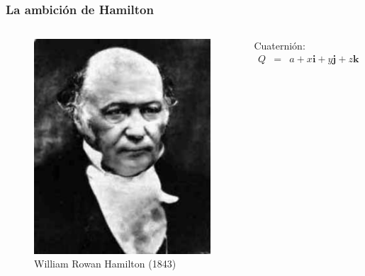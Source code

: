 \documentclass{beamer}
\begin{document}
\begin{frame}
    \frametitle{La ambición de Hamilton}
    \begin{columns}
        \begin{center}
            \begin{figure}
            \includegraphics[scale=0.4]{../gfx/hamilton}
                \caption{William Rowan Hamilton (1843)}
            \end{figure}
        \end{center}
        Cuaternión:
        \begin{eqnarray*}
            Q &=& a + x\bm{i} + y\bm{j} + z\bm{k}
        \end{eqnarray*}
    \end{columns}
\end{frame}
\end{document}
